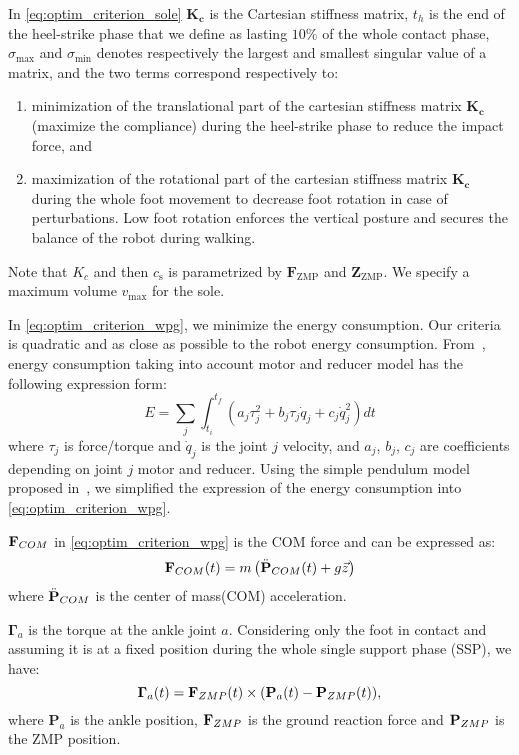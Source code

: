 \documentclass[journal]{IEEEtran}
\begin{document}
In \eqref{eq:optim_criterion_sole} $\boldsymbol{K_{c}}$ is the Cartesian stiffness matrix, $t_h$ is the end of the heel-strike phase that we define as lasting $10\%$ of the whole contact phase, $\sigma_{\max}$ and $\sigma_{\min}$ denotes respectively the largest and smallest singular value of a matrix, and the two terms correspond respectively to:
\begin{enumerate}
  \item minimization of the translational part of the cartesian stiffness matrix $\boldsymbol{K_{c}}$ (maximize the compliance) during the heel-strike phase to reduce the impact force, and
  \item maximization of the rotational part of the cartesian stiffness matrix $\boldsymbol{K_{c}}$ during the whole foot movement to decrease foot rotation in case of perturbations. Low foot rotation enforces the vertical posture and secures the balance of the robot during walking.
\end{enumerate}
Note that $K_c$ and then $c_\text{s}$ is parametrized by $\boldsymbol{F}_{\text{ZMP}}$ and $\boldsymbol{Z}_{\text{ZMP}}$. We specify a maximum volume $v_{\max}$ for the sole.

In \eqref{eq:optim_criterion_wpg}, we minimize the energy consumption. Our criteria is quadratic and as close as possible to the robot energy consumption. From~\cite{shin:tro:2014}, energy consumption taking into account motor and reducer model has the following expression form:
\begin{equation}
\label{eq:energy_consumption}
E = \sum_j \int_{t_{i}}^{t_{f}} (a_j \tau _j^{2} + b_j  \tau_j \dot{q}_j + c_j \dot{q}_j^{2}) dt
\end{equation}
where $\tau_j$ is force/torque and $\dot{q}_j$ is the joint $j$ velocity, and $a_j$, $b_j$, $c_j$ are coefficients depending on joint $j$ motor and reducer. Using the simple pendulum model proposed in~\cite{kajita:springer:2008}, we simplified the expression of the energy consumption into \eqref{eq:optim_criterion_wpg}.

$\mathbf{F}_{\mbox{\tiny COM}}$ in \eqref{eq:optim_criterion_wpg} is the COM force and can be expressed as:
\begin{equation}
\label{eq:fcom}
\mathbf{F}_{\mbox{\tiny COM}}(t)=m \left( \ddot{\textbf{P}}_{\mbox{\tiny COM}}(t) + g\vec{z} \right )
\end{equation}
where $\ddot{\textbf{P}}_{\mbox{\tiny COM}}$ is the center of mass(COM) acceleration.

$\mathbf{\Gamma}_a$ is the torque at the ankle joint $a$.
Considering only the foot in contact and assuming it is at a fixed position during the whole single support phase (SSP), we have:
\begin{equation}
\label{eq:torque_simple_criterion}
\mathbf{\Gamma}_a(t)=\mathbf{F}_{\mbox{\tiny ZMP}}(t)\times (\textbf{P}_a(t)-\textbf{P}_{\mbox{\tiny ZMP}}(t)),
\end{equation}
where $\textbf{P}_a$ is the ankle position, $\mathbf{F}_{\mbox{\tiny ZMP}}$ is the ground reaction force and $\textbf{P}_{\mbox{\tiny ZMP}}$ is the ZMP position.
\end{document}
